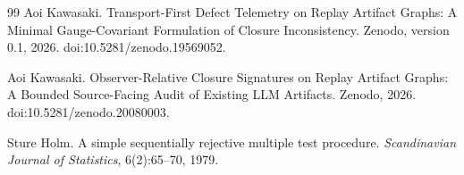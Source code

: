 \documentclass[11pt]{article}
\begin{document}
\begin{thebibliography}{99}
Aoi Kawasaki.
\newblock Transport-First Defect Telemetry on Replay Artifact Graphs:
A Minimal Gauge-Covariant Formulation of Closure Inconsistency.
\newblock Zenodo, version 0.1, 2026.
\newblock doi:10.5281/zenodo.19569052.

Aoi Kawasaki.
\newblock Observer-Relative Closure Signatures on Replay Artifact Graphs:
A Bounded Source-Facing Audit of Existing LLM Artifacts.
\newblock Zenodo, 2026.
\newblock doi:10.5281/zenodo.20080003.

Sture Holm.
\newblock A simple sequentially rejective multiple test procedure.
\newblock \emph{Scandinavian Journal of Statistics}, 6(2):65--70, 1979.

\end{thebibliography}
\end{document}
